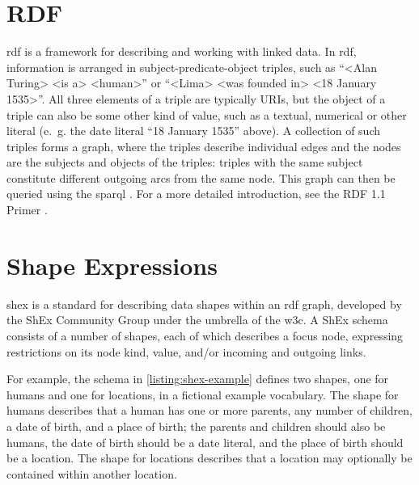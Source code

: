 
\section{RDF}
\label{ch:Background:RDF}

\acrfull{rdf}
\cite{Lanthaler:14:RCA}
is a framework for describing and working with linked data.
In \gls{rdf}, information is arranged in subject-predicate-object triples,
such as “<Alan Turing> <is a> <human>”
or “<Lima> <was founded in> <18 January 1535>”.
All three elements of a triple are typically URIs, %
but the object of a triple can also be some other kind of value,
such as a textual, numerical or other literal
(e.~g. the date literal “18 January 1535” above). %
A collection of such triples forms a graph,
where the triples describe individual edges
and the nodes are the subjects and objects of the triples:
triples with the same subject constitute different outgoing arcs from the same node.
This graph can then be queried using the \acrlong{sparql} \cite{9569543}. %
For a more detailed introduction,
see the RDF 1.1 Primer \cite{Schreiber:14:RP}.


\section{Shape Expressions}
\label{ch:Background:ShEx}

\acrfull{shex} \cite{shex}
is a standard for describing data shapes within an \gls{rdf} graph,
developed by the ShEx Community Group under the umbrella of the \gls{w3c}.
A ShEx schema consists of a number of shapes,
each of which describes a focus node,
expressing restrictions on its node kind, value, and/or incoming and outgoing links.

For example, the schema in \cref{listing:shex-example} defines two shapes,
one for humans and one for locations,
in a fictional example vocabulary.
The shape for humans describes that a human has one or more parents,
any number of children,
a date of birth,
and a place of birth;
the parents and children should also be humans,
the date of birth should be a date literal,
and the place of birth should be a location.
The shape for locations describes that a location may optionally be contained within another location.

